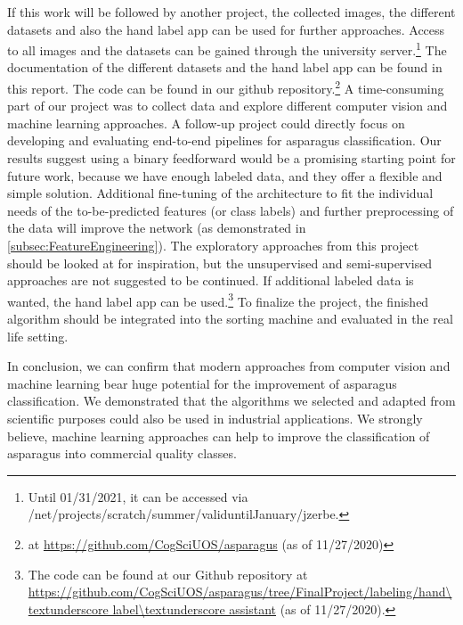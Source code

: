 \bigskip
If this work will be followed by another project, the collected images, the different datasets and also the hand label app can be used for further approaches. Access to all images and the datasets can be gained through the university server.\footnote{ Until 01/31/2021, it can be accessed via \\ /net/projects/scratch/summer/valid\textunderscore until\textunderscore January/jzerbe.} The documentation of the different datasets and the hand label app can be found in this report. The code can be found in our github repository.\footnote{ at \url{https://github.com/CogSciUOS/asparagus} (as of 11/27/2020)} A time-consuming part of our project was to collect data and explore different computer vision and machine learning approaches. A follow-up project could directly focus on developing and evaluating end-to-end pipelines for asparagus classification. Our results suggest using a binary feedforward  would be a promising starting point for future work, because we have enough labeled data, and they offer a flexible and simple solution. Additional fine-tuning of the architecture to fit the individual needs of the to-be-predicted features (or class labels) and further preprocessing of the data will improve the network (as demonstrated in \autoref{subsec:FeatureEngineering}). The exploratory approaches from this project should be looked at for inspiration, but the unsupervised and semi-supervised approaches are not suggested to be continued. If additional labeled data is wanted, the hand label app can be used.\footnote{The code can be found at our Github repository at \url{https://github.com/CogSciUOS/asparagus/tree/FinalProject/labeling/hand\textunderscore label\textunderscore assistant} (as of 11/27/2020).} To finalize the project, the finished algorithm should be integrated into the sorting machine and evaluated in the real life setting.

\bigskip
In conclusion, we can confirm that modern approaches from computer vision and machine learning bear huge potential for the improvement of asparagus classification. We demonstrated that the algorithms we selected and adapted from scientific purposes could also be used in industrial applications. We strongly believe, machine learning approaches can help to improve the classification of asparagus into commercial quality classes.